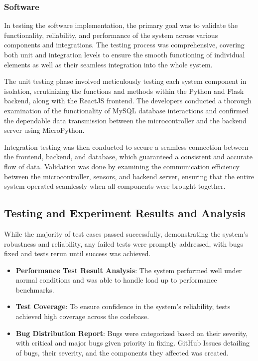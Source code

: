 \subsubsection{Software}

In testing the software implementation, the primary goal was to validate the functionality,
reliability, and performance of the system across various components and integrations. %
The testing process was comprehensive, covering both unit and integration levels to
ensure the smooth functioning of individual elements as well as their
seamless integration into the whole system. %

The unit testing phase involved meticulously testing each system component in isolation,
scrutinizing the functions and methods within the Python and Flask backend, along
with the ReactJS frontend. %
The developers conducted a thorough examination of the functionality of MySQL database interactions and confirmed the dependable data
transmission between the microcontroller and the backend server using MicroPython. %

Integration testing was then conducted to secure a seamless connection between
the frontend, backend, and database, which guaranteed a consistent and accurate
flow of data. %
Validation was done by examining the communication efficiency between the microcontroller, sensors, and backend server, ensuring that the entire system
operated seamlessly when all components were brought together. %

\subsection{Testing and Experiment Results and Analysis}\label{subsec:testing-and-experiment-results-and-analysis}

While the majority of test cases passed successfully, demonstrating the system’s
robustness and reliability, any failed tests were promptly addressed,
with bugs fixed and tests rerun until success was achieved. %

\begin{itemize}
      \item \textbf{Performance Test Result Analysis}: The system performed well
            under normal conditions and was able to handle load up to performance benchmarks. %
      \item \textbf{Test Coverage}: To ensure confidence in the system’s reliability,
            tests achieved high coverage across the codebase. %
      \item \textbf{Bug Distribution Report}: Bugs were categorized based on their
            severity, with critical and major bugs given priority in fixing.  %
            GitHub Issues detailing of bugs, their severity, and the components
            they affected was created. %
\end{itemize}

